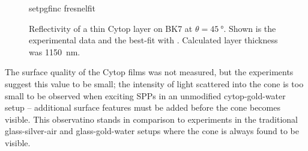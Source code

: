 \begin{figure}
 \centering
 {setpgfinc}
 {fresnelfit}
 \caption{Reflectivity of a thin Cytop layer on BK7 at
 $\theta=\SI{45}{\degree}$.  Shown is the experimental data and the
	best-fit with .  Calculated layer thickness was \SI{1150}{\nano\meter}.}
\label{fig:fresnelfit}
\end{figure}

The surface quality of the Cytop films was not measured, but the
experiments suggest this value to be small; the intensity of light
scattered into the cone is too small to be observed when exciting SPPs in
an unmodified cytop-gold-water setup -- additional surface features must be
added before the cone becomes visible.  This observatino stands in
comparison to experiments in the traditional glass-silver-air and
glass-gold-water setups where the cone is always found to be visible.
